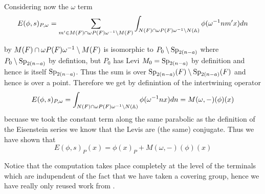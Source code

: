      Considering now the \(\omega\) term 
     \[E(\phi, s)_{P, \omega} =  \sum_{m'\in M(F)\cap \omega P(F)\omega\inv\setminus M(F)} \int_{N(F)\cap \omega P(F)\omega\inv \setminus N(\A)} \phi( \omega\inv nm' x)  dn\]

     by \cite[2C]{jiangPolesCertainResidual2013} \(M(F)\cap \omega P(F)\omega^{-1} \setminus M(F)\) is isomorphic to \(P_0 \setminus \operatorname{Sp}_{2(n-a)}\) where \(P_0 \setminus \operatorname{Sp}_{2(n-a)}\) by defintion, but \(P_0\) has Levi \(M_0 = \operatorname{Sp}_{2(n-a)}\) by definition and hence is itself \(\operatorname{Sp}_{2(n-a)}\). Thus the sum is over \(\operatorname{Sp}_{2(n-a)}(F) \setminus \operatorname{Sp}_{2(n-a)}(F)\) and hence is over a point. Therefore we get by definintion of the intertwining operator
     \[E(\phi, s)_{P, \omega} = \int_{N(F)\cap \omega P(F)\omega\inv \setminus N(\A)} \phi( \omega\inv n x)  dn = M(\omega, -)(\phi)(x)\]
     becuase we took the constant term along the same parabolic as the definition of the Eisenstein series we know that the Levis are (the same) conjugate.
    Thus we have shown that 
    \[E(\phi, s)_P(x) = \phi(x)_P + M(\omega, - )(\phi)(x)\]

    Notice that the computation takes place completely at the level of the terminals which are indupendent of the fact that we have taken a covering group, hence we have really only reused work from \cite{jiangPolesCertainResidual2013}.
